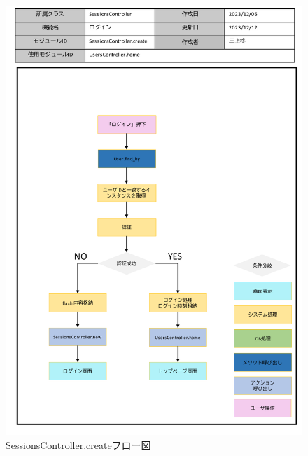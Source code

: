 \begin{figure}
	\centering
	\includegraphics[scale=0.6]{img/Sessions/pptx/SessionsController_create.pdf}
	\caption{SessionsController.createフロー図}
\end{figure}
\clearpage
